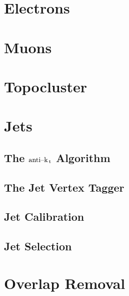 \documentclass[10pt,twoside,cucitura,classica,english,openany]{toptesi}
\begin{document}
\section{Electrons}
\label{sec:electrons}



\section{Muons}
\label{sec:muons}



\section{Topocluster}
\label{sec:topocluster}



\section{Jets}
\label{sec:jets}



\subsection{The \emph{$\text{anti--k}_\mathrm{\, t}$} Algorithm}
\label{sec:anti-k_t}



\subsection{The Jet Vertex Tagger }
\label{sec:jet-vertex-tagger}



\subsection{Jet Calibration}
\label{sec:jet-calibration}



\subsection{Jet Selection}
\label{sec:jet-selection}



\section{Overlap Removal}
\label{sec:overlap-removal}
\end{document}
